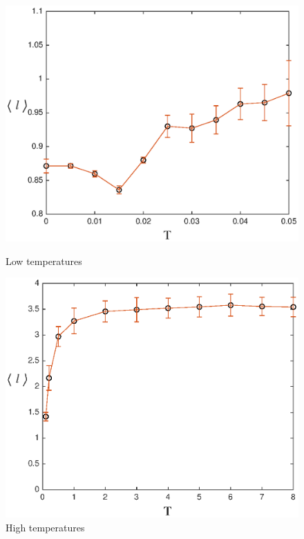 \documentclass[a4paper]{article}
\begin{document}
\begin{figure}[!htbp]
  \centering
  \begin{minipage}[b]{7.5cm}
    \includegraphics[width=\textwidth]{plot2_v2.eps}
    \caption{Low temperatures}
  \end{minipage}
  \begin{minipage}[b]{7.5cm}
    \includegraphics[width=\textwidth]{plot3_v2.eps}
    \caption{High temperatures}
  \end{minipage}
\end{figure}
\end{document}
